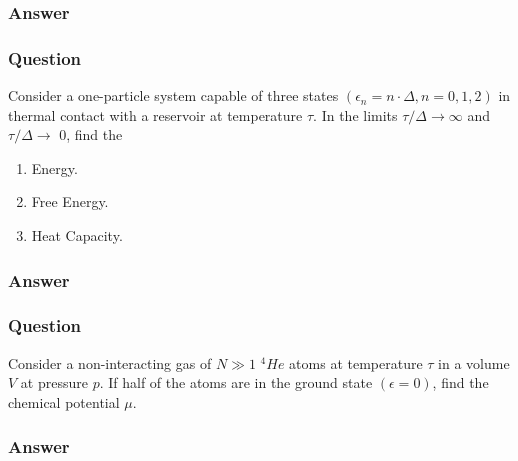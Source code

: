 \subsubsection{Answer}

\subsubsection{Question}
Consider a one-particle system capable of three states $(\epsilon_n = n\cdot \Delta, n = 0, 1, 2)$ in thermal contact with a reservoir at temperature ${\tau}$. In the limits ${\tau}/{\Delta} {\to} {\infty}$ and ${\tau}/{\Delta} {\to}$ 0, find the
\begin{enumerate}
	\item Energy.
	\item Free Energy.
	\item Heat Capacity. 
\end{enumerate}
\subsubsection{Answer}



\subsubsection{Question}
Consider a non-interacting gas of $N {\gg} 1$ ${}^4He$ atoms at temperature ${\tau}$ in a volume $V$ at pressure $p$. If half of the atoms are in the ground state $({\epsilon} = 0)$, find the chemical potential $\mu$.



\subsubsection{Answer}


